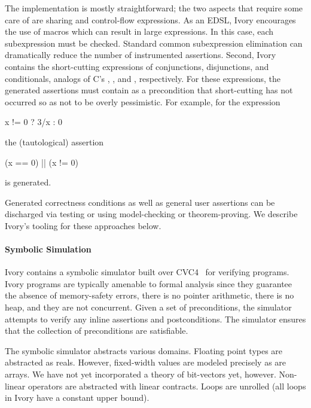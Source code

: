 The implementation is mostly straightforward; the two aspects that require some
care of are sharing and control-flow expressions. As an EDSL, Ivory encourages
the use of macros which can result in large expressions. In this case, each
subexpression must be checked. Standard common subexpression elimination can
dramatically reduce the number of instrumented assertions. Second, Ivory contains
the short-cutting expressions of conjunctions, disjunctions, and conditionals,
analogs of C's \cd{\&\&}, \cd{||}, and , respectively. For these
expressions, the generated assertions must contain as a precondition that
short-cutting has not occurred so as not to be overly pessimistic. For example,
for the expression
\noindent
\begin{code}
x != 0 ? 3/x : 0
\end{code}
\noindent
the (tautological) assertion
\begin{code}
(x == 0) || (x != 0)
\end{code}
\noindent
is generated.

Generated correctness conditions as well as general user assertions can be
discharged via testing or using model-checking or theorem-proving. We describe
Ivory's tooling for these approaches below.

\paragraph{Symbolic Simulation}
Ivory contains a symbolic simulator built over CVC4~\cite{cvc4} for verifying
programs. Ivory programs are typically amenable to formal analysis since they
guarantee the absence of memory-safety errors, there is no pointer arithmetic,
there is no heap, and they are not concurrent. Given a set of preconditions, the
simulator attempts to verify any inline assertions and postconditions. The
simulator ensures that the collection of preconditions are satisfiable.

The symbolic simulator abstracts various domains. Floating point types are
abstracted as reals. However, fixed-width values are modeled precisely as are
arrays. We have not yet incorporated a theory of bit-vectors yet,
however.  Non-linear operators are abstracted with linear contracts. Loops are
unrolled (all loops in Ivory have a constant upper bound).

